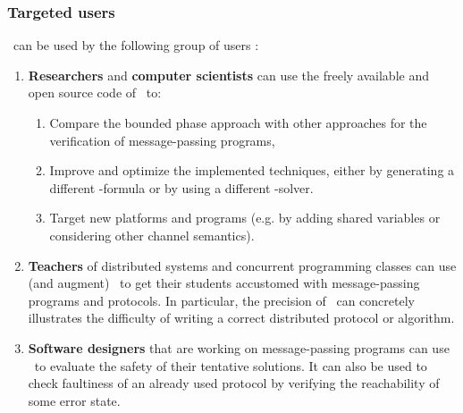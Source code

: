 \subsubsection{Targeted users}
%
\MPass\ can be used by the following group of users :
%
\begin{enumerate}
%
\item \textbf{Researchers} and \textbf{computer scientists} can use the freely available and open source code of \MPass\ to:
\begin{enumerate}
\item Compare the bounded phase approach with other approaches for the verification of message-passing programs,
\item Improve and optimize the implemented techniques,
either by generating a different \Smt-formula or by using a different \Smt-solver.
\item Target new platforms and programs (e.g. by adding shared variables or considering other channel semantics).
\end{enumerate}
%  
\item \textbf{Teachers} of distributed  systems  and concurrent programming classes can use (and augment) \MPass\ 
  to get their students accustomed with message-passing programs and protocols.
  In particular, the precision of \MPass\ can concretely illustrates the difficulty of writing a correct distributed protocol or algorithm.
%
\item \textbf{Software designers} that are working on message-passing programs can use \MPass\ to evaluate the safety of their tentative solutions.
  It can also be used to check faultiness of an already used protocol by verifying the reachability of some error state.
%
\end{enumerate}